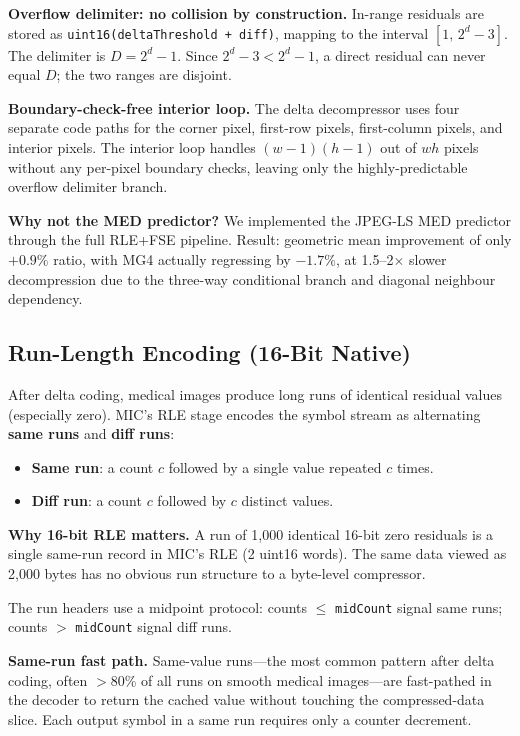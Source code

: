 \documentclass[10pt,twocolumn]{article}
\begin{document}
\textbf{Overflow delimiter: no collision by construction.} In-range residuals
are stored as \texttt{uint16(deltaThreshold + diff)}, mapping to the interval
$[1,\, 2^d-3]$. The delimiter is $D = 2^d - 1$. Since $2^d-3 < 2^d-1$, a
direct residual can never equal $D$; the two ranges are disjoint.

\textbf{Boundary-check-free interior loop.} The delta decompressor uses four
separate code paths for the corner pixel, first-row pixels, first-column pixels,
and interior pixels. The interior loop handles $(w-1)(h-1)$ out of $wh$ pixels
without any per-pixel boundary checks, leaving only the highly-predictable
overflow delimiter branch.

\textbf{Why not the MED predictor?} We implemented the JPEG-LS MED predictor
through the full RLE+FSE pipeline. Result: geometric mean improvement of only
$+0.9\%$ ratio, with MG4 actually regressing by $-1.7\%$, at 1.5--2$\times$
slower decompression due to the three-way conditional branch and diagonal
neighbour dependency.

\subsection{Run-Length Encoding (16-Bit Native)}

After delta coding, medical images produce long runs of identical residual
values (especially zero). MIC's RLE stage encodes the symbol stream as
alternating \textbf{same runs} and \textbf{diff runs}:
\begin{itemize}
  \item \textbf{Same run}: a count $c$ followed by a single value repeated
  $c$ times.
  \item \textbf{Diff run}: a count $c$ followed by $c$ distinct values.
\end{itemize}

\textbf{Why 16-bit RLE matters.} A run of 1,000 identical 16-bit zero residuals
is a single same-run record in MIC's RLE (2 uint16 words). The same data viewed
as 2,000 bytes has no obvious run structure to a byte-level compressor.

The run headers use a midpoint protocol: counts $\leq$ \texttt{midCount} signal
same runs; counts $>$ \texttt{midCount} signal diff runs.

\textbf{Same-run fast path.} Same-value runs---the most common pattern after
delta coding, often $>$80\% of all runs on smooth medical images---are
fast-pathed in the decoder to return the cached value without touching the
compressed-data slice. Each output symbol in a same run requires only a counter
decrement.
\end{document}
